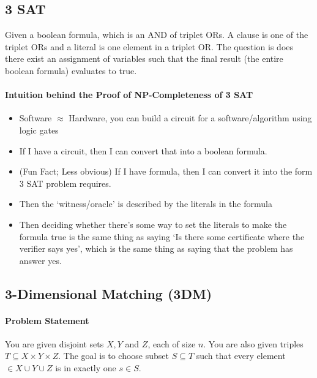 \documentclass[10pt]{article}
\begin{document}
\subsection{3 SAT} Given a boolean formula, which is an AND of triplet ORs. A clause is one of the triplet ORs and a literal is one element in a triplet OR. The question is does there exist an assignment of variables such that the final result (the entire boolean formula) evaluates to true. 
\paragraph{Intuition behind the Proof of NP-Completeness of 3 SAT}
\begin{itemize}
    \item Software $\approx$ Hardware, you can build a circuit for a software/algorithm using logic gates
    \item If I have a circuit, then I can convert that into a boolean formula.
    \item (Fun Fact; Less obvious) If I have formula, then I can convert it into the form 3 SAT problem requires. 
    \item Then the `witness/oracle' is described by the literals in the formula
    \item Then deciding whether there's some way to set the literals to make the formula true is the same thing as saying `Is there some certificate where the verifier says yes', which is the same thing as saying that the problem has answer yes.
\end{itemize}

\subsection{3-Dimensional Matching (3DM)}
\paragraph{Problem Statement} You are given disjoint sets $X, Y$ and $Z$, each of size $n$. You are also given triples $T\subseteq X\times Y \times Z$. The goal is to choose subset $S\subseteq T$ such that every element $\in X \cup Y \cup Z$ is in exactly one $s\in S$. 
\end{document}
